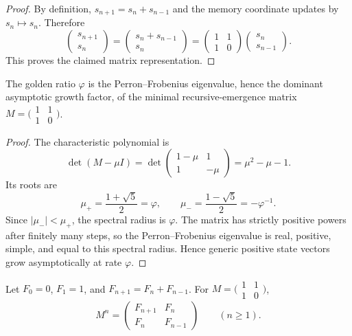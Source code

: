 \begin{proof}
\label{proof:appC_matrix_rep_symbolic_operators}
By definition,
$s_{n+1}=s_n+s_{n-1}$ and the memory coordinate updates by
$s_n\mapsto s_n$. Therefore
\[
\begin{pmatrix}s_{n+1}\\s_n\end{pmatrix}
=\begin{pmatrix}s_n+s_{n-1}\\s_n\end{pmatrix}
=\begin{pmatrix}1&1\\1&0\end{pmatrix}
\begin{pmatrix}s_n\\s_{n-1}\end{pmatrix}.
\]
This proves the claimed matrix representation.
\end{proof}

\begin{theorem}
\label{theorem:appC_phi_eigenvalue_recursive_emergence}
The golden ratio $\varphi$ is the Perron--Frobenius eigenvalue, hence the dominant
asymptotic growth factor, of the minimal recursive-emergence matrix
$M=\bigl(\begin{smallmatrix}1&1\\1&0\end{smallmatrix}\bigr)$.
\end{theorem}

\begin{proof}
\label{proof:appC_phi_eigenvalue_recursive_emergence}
The characteristic polynomial is
\[
\det(M-\mu I)=\det\begin{pmatrix}1-\mu&1\\1&-\mu\end{pmatrix}
=\mu^2-\mu-1.
\]
Its roots are
\[
\mu_+=\frac{1+\sqrt5}{2}=\varphi,
\qquad
\mu_- =\frac{1-\sqrt5}{2}=-\varphi^{-1}.
\]
Since $|\mu_-|<\mu_+$, the spectral radius is $\varphi$. The matrix has strictly
positive powers after finitely many steps, so the Perron--Frobenius eigenvalue is
real, positive, simple, and equal to this spectral radius. Hence generic positive
state vectors grow asymptotically at rate $\varphi$.
\end{proof}

\begin{lemma}
\label{lemma:appC_fibonacci_structure_matrix_powers}
Let $F_0=0$, $F_1=1$, and $F_{n+1}=F_n+F_{n-1}$. For
$M=\bigl(\begin{smallmatrix}1&1\\1&0\end{smallmatrix}\bigr)$,
\[
M^n=\begin{pmatrix}F_{n+1}&F_n\\F_n&F_{n-1}\end{pmatrix}\qquad(n\ge1).
\]
\end{lemma}

